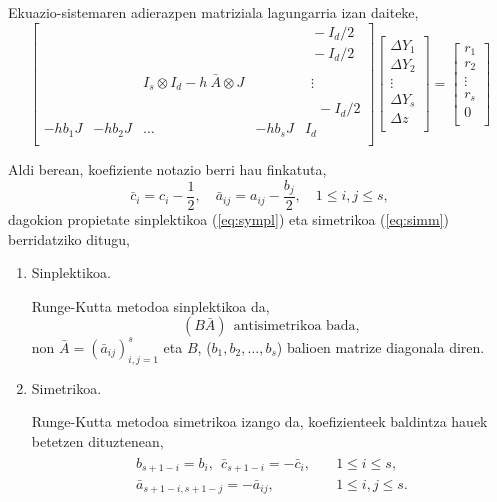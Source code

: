 Ekuazio-sistemaren adierazpen matriziala lagungarria izan daiteke,
\begin{equation*}
\begin{bmatrix}
    &      &      &  & \ \ -I_d/2 \\
    &      &      &  & \ \ -I_d/2 \\
    &      &      &  & \ \      \\    
    &  & I_s \otimes I_d- h \ \bar{A} \otimes J & & \ \ \vdots \\
    &      &      &  & \ \      \\
    &      &      &  & \ \ \ \ -I_d/2    \\
-hb_1 J & -hb_2 J & \dots & -hb_s J &  I_d\\ 
\end{bmatrix}
\begin{bmatrix}
\Delta Y_1 \\
\Delta Y_2 \\
\vdots \\
\Delta Y_s \\
\Delta z\\
\end{bmatrix}=
\begin{bmatrix}
r_1 \\
r_2 \\
\vdots \\
r_s \\
0\\
\end{bmatrix}
\end{equation*} 

Aldi berean, koefiziente notazio berri hau finkatuta,
\begin{equation*}
\bar{c}_i=c_i-\frac{1}{2}, \quad \bar{a}_{ij}=a_{ij}-\frac{b_j}{2}, \quad 1\leqslant i,j \leqslant s,
\end{equation*}
dagokion propietate sinplektikoa (\ref{eq:sympl}) eta simetrikoa (\ref{eq:simm}) berridatziko ditugu,
\begin{enumerate}
\item {Sinplektikoa.}

Runge-Kutta metodoa sinplektikoa da,
\begin{equation}
\label{eq:eqlineala}
(B \bar{A}) \ \ \mbox{antisimetrikoa bada},
\end{equation}
non $\bar{A}=(\bar{a}_{ij})_{i,j=1}^s$ eta $B$, ($b_1,b_2,\dots,b_s$) balioen matrize diagonala diren.

\item {Simetrikoa.}

Runge-Kutta metodoa simetrikoa izango da, koefizienteek baldintza hauek betetzen dituztenean,
\begin{align}
\label{eq:simm2}
\begin{split}
b_{s+1-i}=b_i, \ \ \bar{c}_{s+1-i}=-\bar{c}_i,& \quad 1\leq i \leq s, \\
\bar{a}_{s+1-i,s+1-j}=-\bar{a}_{ij},& \quad 1\leq i,j \leq s. 
\end{split}
\end{align} 

\end{enumerate}

